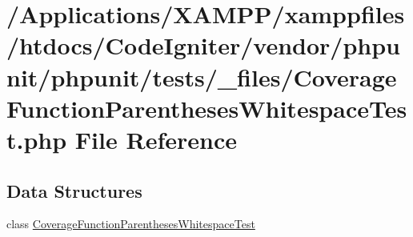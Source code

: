 \hypertarget{phpunit_2tests_2__files_2_coverage_function_parentheses_whitespace_test_8php}{}\section{/\+Applications/\+X\+A\+M\+P\+P/xamppfiles/htdocs/\+Code\+Igniter/vendor/phpunit/phpunit/tests/\+\_\+files/\+Coverage\+Function\+Parentheses\+Whitespace\+Test.php File Reference}
\label{phpunit_2tests_2__files_2_coverage_function_parentheses_whitespace_test_8php}
\subsection*{Data Structures}
\begin{DoxyCompactItemize}
\item 
class \mbox{\hyperlink{class_coverage_function_parentheses_whitespace_test}{Coverage\+Function\+Parentheses\+Whitespace\+Test}}
\end{DoxyCompactItemize}

